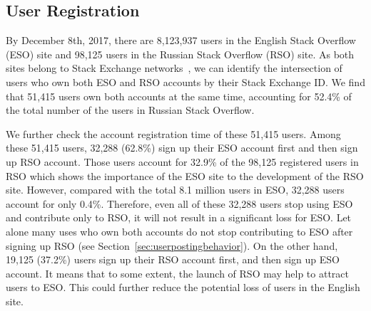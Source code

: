 \subsection{User Registration}

By December 8th, 2017, there are 8,123,937 users in the English Stack Overflow (ESO) site and 98,125 users in the Russian Stack Overflow (RSO) site. 
As both sites belong to Stack Exchange networks~\cite{web:StackExchange}, we can identify the intersection of users who own both ESO and RSO accounts by their Stack Exchange ID.
We find that 51,415 users own both accounts at the same time, accounting for 52.4\% of the total number of the users in Russian Stack Overflow.

We further check the account registration time of these 51,415 users.
Among these 51,415 users, 32,288 (62.8\%) sign up their ESO account first and then sign up RSO account.
Those users account for 32.9\% of the 98,125 registered users in RSO which shows the importance of the ESO site to the development of the RSO site.
However, compared with the total 8.1 million users in ESO, 32,288 users account for only 0.4\%.
Therefore, even all of these 32,288 users stop using ESO and contribute only to RSO, it will not result in a significant loss for ESO.
Let alone many uses who own both accounts do not stop contributing to ESO after signing up RSO (see Section~\ref{sec:userpostingbehavior}). 
On the other hand, 19,125 (37.2\%) users sign up their RSO account first, and then sign up ESO account.
It means that to some extent, the launch of RSO may help to attract users to ESO.
This could further reduce the potential loss of users in the English site.


